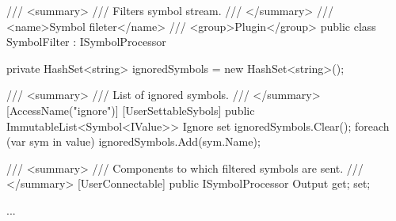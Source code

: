 \begin{Csharp}[label=lsys:compDoc,caption={Symbol filter component with documented members}]
/// <summary>
/// Filters symbol stream.
/// </summary>
/// <name>Symbol fileter</name>
/// <group>Plugin</group>
public class SymbolFilter : ISymbolProcessor {

	private HashSet<string> ignoredSymbols = new HashSet<string>();

	/// <summary>
	/// List of ignored symbols.
	/// </summary>
	[AccessName("ignore")]
	[UserSettableSybols]
	public ImmutableList<Symbol<IValue>> Ignore {
		set {
			ignoredSymbols.Clear();
			foreach (var sym in value) {
				ignoredSymbols.Add(sym.Name);
			}
		}
	}

	/// <summary>
	/// Components to which filtered symbols are sent.
	/// </summary>
	[UserConnectable]
	public ISymbolProcessor Output { get; set; }

	...
}
\end{Csharp}

























